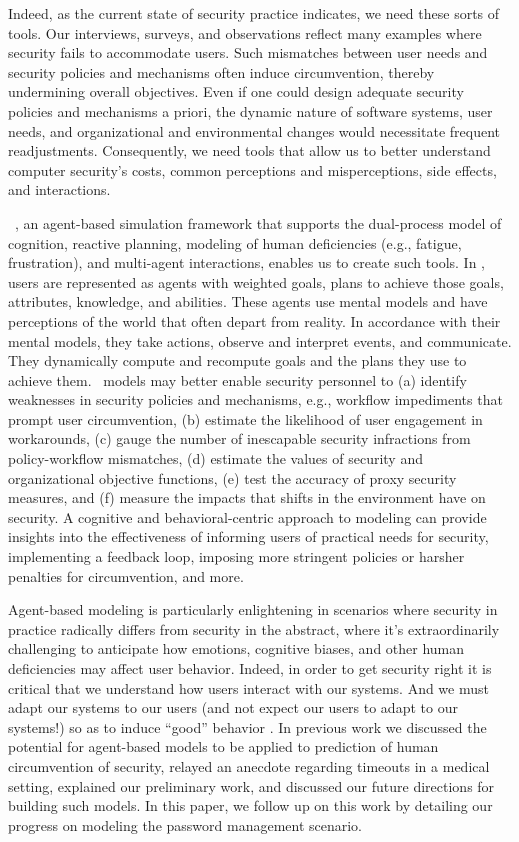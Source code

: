 \documentclass[conference]{IEEEtran}
\begin{document}
Indeed, as the current state of security practice indicates, we need 
these sorts of tools. Our interviews, surveys, and observations reflect many 
examples where security fails to accommodate users. Such 
mismatches between user needs and security policies and 
mechanisms often induce circumvention, thereby undermining 
overall objectives. Even if one could design adequate security
policies and mechanisms a priori, the dynamic nature of software
systems, user needs, and organizational and environmental 
changes would necessitate frequent readjustments. 
Consequently, we need tools that allow us to better understand 
computer security's costs, common perceptions and misperceptions, 
side effects, and interactions.

\dash\ \cite{blythe2012implementing, blythe2012dual}, an agent-based 
simulation framework that supports the dual-process model of 
cognition, reactive planning, modeling of human deficiencies 
(e.g., fatigue, frustration), and multi-agent interactions, enables us to 
create such tools. In \dash, 
users are represented as agents with weighted goals, plans to 
achieve those goals, attributes, knowledge, and abilities. These 
agents use mental models and have perceptions of the world that 
often depart from reality. In accordance with their mental models, 
they take actions, observe and interpret events, and communicate. 
They dynamically compute and recompute goals and the plans 
they use to achieve them. \dash\ models may better enable 
security personnel to (a) identify weaknesses in security 
policies and mechanisms, e.g., workflow impediments that 
prompt user circumvention, (b) estimate the likelihood of user 
engagement in workarounds, (c) gauge the number of 
inescapable security infractions from policy-workflow 
mismatches, (d) estimate the values of security and 
organizational objective functions, (e) test the accuracy of 
proxy security measures, and (f) measure the impacts that shifts 
in the environment have on security. A cognitive and 
behavioral-centric approach to modeling can 
provide insights into the effectiveness of informing users of 
practical needs for security, implementing a feedback loop, 
imposing more stringent policies or harsher penalties for 
circumvention, and more.

Agent-based modeling is particularly enlightening in scenarios 
where security in practice radically differs from security in 
the abstract, where it's extraordinarily challenging to anticipate 
how emotions, cognitive biases, and other human deficiencies 
may affect user behavior. Indeed, in order to get security right it is 
critical that we understand how users interact with our systems.
And we must adapt our systems to our users (and not 
expect our users to adapt to our systems!) so as to induce ``good'' 
behavior \cite{blythe2013circumvention, adams1999users}. In previous work 
\cite{kothari2014agent} we discussed the potential for agent-based 
models to be applied to prediction of human circumvention of security, 
relayed an anecdote regarding timeouts in a medical setting, 
explained our preliminary work, and discussed our future directions 
for building such models. In this paper, we follow up on this 
work by detailing our progress on modeling the password 
management scenario.
\end{document}

